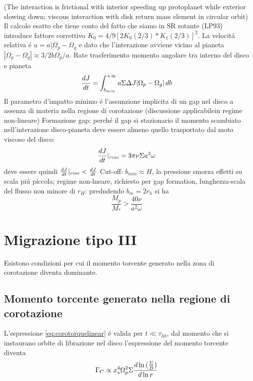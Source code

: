 \begin{workout}
(The interaction is frictional with interior speeding up protoplanet while exterior slowing down; viscous interaction with disk return mass element in circular orbit)
Il calcolo esatto che tiene conto del fatto che siamo in SR rotante (LP93) introduce fattore correttivo $K_0=4/9[2K_0(2/3)*K_1(2/3)]^2$.
La velocit\'a relativa \'e $u=a|\Omega_p-\Omega_g$ e dato che l'interazione avviene vicino al pianeta $|\Omega_p-\Omega_g|\approx3/2b\Omega_p/a$.
Rate trasferimento momento angolare tra interno del disco e pianeta
\begin{equation}
\TDy{t}{J}=\int_{b_{min}}^{+\infty}a\Sigma\Delta J|\Omega_p-\Omega_g|\,db
\end{equation}
Il parametro d'impatto minimo \'e l'assunzione implicita di un gap nel disco a assenza di materia nella regione di corotazione (discussione applicabilein regime non-lineare)
Formazione gap: perch\'e il gap si stazionario il momento scambiato nell'interazione disco-pianeta deve essere almeno quello trasportato dal moto viscoso del disco:
\begin{equation}
\TDy{t}{J}|_{visc}=3\pi\nu\Sigma a^2\omega
\end{equation}
deve essere quindi $\TDy{t}{J}|_{visc}<\TDy{t}{J}$
Cut-off: $b_{min}\approx H$, la pressione smorza effetti su scala pi\'u piccola; regime non-lneare, richiesto per gap formation, lunghezza-scala del flusso non minore di $r_H$: predndendo $b_m=2r_h$ si ha
\begin{equation}
\frac{M_p}{M_*}>\frac{40\nu}{a^2\omega}
\end{equation}
\end{workout}


\section{Migrazione tipo III}

Esistono condizioni per cui il momento torcente generato nella zona di corotazione diventa dominante.

\subsection{Momento torcente generato nella regione di corotazione}

L'espressione \ref{eq:corotorquelinear} \'e valida per $t\ll\tau_{lib}$, dal momento che si instaurano orbite di librazione nel disco l'espressione del momento torcente diventa
\begin{equation}
\Gamma_C\propto x_s^4\Omega_p^2\Sigma\TDly{r}{(\frac{\Sigma}{B})}\label{eq:horsetorque}
\end{equation}

